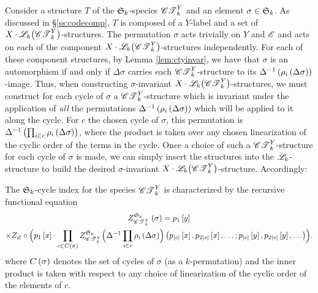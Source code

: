 \documentclass[distribution,draft]{brandiss} %
\numberwithin{section}{chapter}
\numberwithin{figure}{chapter}
\begin{document}
Consider a structure $T$ of the $ \mathfrak{S}_{k} $-species $\mathscr{CT}_{k}^{Y}$ and an element $\sigma \in  \mathfrak{S}_{k} $.
As discussed in \S \ref{ss:codecomp}, $T$ is composed of a $Y$-label and a set of $X \cdot \specname{L}_{k} \pbracs[big]{\cty{k}}$-structures.
The permutation $\sigma$ acts trivially on $Y$ and $\mathscr{E}$ and acts on each of the component $X \cdot \specname{L}_{k} \pbracs[big]{\cty{k}}$-structures independently.
For each of these component structures, by Lemma \ref{lem:ctyinvar}, we have that $\sigma$ is an automorphism if and only if $\Delta \sigma$ carries each $\mathscr{CT}_{k}^{Y}$-structure to its $\Delta^{-1} \left( {\rho_{i} \left( {\Delta \sigma} \right)} \right)$-image.
Thus, when constructing $\sigma$-invariant $X \cdot \specname{L}_{k} \pbracs[big]{\cty{k}}$-structures, we must construct for each cycle of $\sigma$ a $\mathscr{CT}_{k}^{Y}$-structure which is invariant under the application of \emph{all} the permutations $\Delta^{-1} \left( {\rho_{i} \left( {\Delta \sigma} \right)} \right)$ which will be applied to it along the cycle.
For $c$ the chosen cycle of $\sigma$, this permutation is $\Delta^{-1} \left( {\prod_{i \in c} \rho_{i} \left( {\Delta \sigma} \right)} \right)$, where the product is taken over any chosen linearization of the cyclic order of the terms in the cycle.
Once a choice of such a $\mathscr{CT}_{k}^{Y}$-structure for each cycle of $\sigma$ is made, we can simply insert the structures into the $\mathscr{L}_{k}$-structure to build the desired $\sigma$-invariant $X \cdot \specname{L}_{k} \pbracs[big]{\cty{k}}$-structure.
Accordingly:
\begin{theorem}
  \label{thm:ctyfuncci}
  The $ \mathfrak{S}_{k} $-cycle index for the species $\mathscr{CT}_{k}^{Y}$ is characterized by the recursive functional equation
  \begin{multline}
    \label{eq:ctyfuncci}
    \gcielt{\symgp{k}}{\cty{k}}{\sigma} = p_{1} \sbrac{y} \\
    \times \ci{\specname{E}} \circ \pbracs[Big]{p_{1} \sbrac{x} \cdot \prod_{c \in C \pbrac{\sigma}} \gci{\symgp{k}}{\cty{k}} \pbracs[Big]{\Delta^{-1} \prod_{i \in c} \rho_{i} \pbrac{\Delta \sigma}} \pbrac{p_{\abs{c}} \sbrac{x}, p_{2 \abs{c}} \sbrac{x}, \dots; p_{\abs{c}} \sbrac{y}, p_{2 \abs{c}} \sbrac{y}, \dots}}.
  \end{multline}
  where $C \left( {\sigma} \right)$ denotes the set of cycles of $\sigma$ (as a $k$-permutation) and the inner product is taken with respect to any choice of linearization of the cyclic order of the elements of $c$.
\end{theorem}
\end{document}
